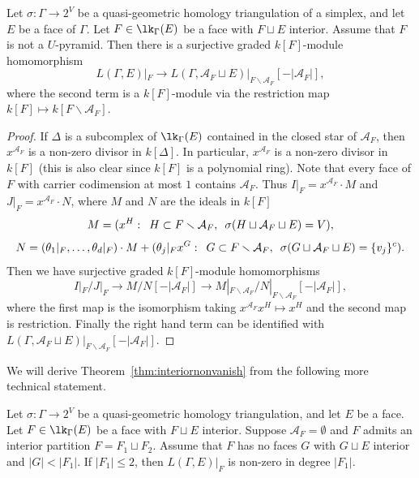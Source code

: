 \begin{lemma}\label{lem:restriction}
Let $\sigma\colon \Gamma \to 2^V$ be a quasi-geometric homology triangulation of a simplex, and let $E$ be a face of $\Gamma$. Let $F \in \lk_{\Gamma}(E)$ be a face with $F \sqcup E$ interior. Assume that $F$ is not a $U$-pyramid. 
Then there is a surjective graded $k[F]$-module homomorphism
$$L(\Gamma, E)|_{F} \to L(\Gamma, \mathcal{A}_F \sqcup E)|_{F \smallsetminus \mathcal{A}_F}[-\vert \mathcal{A}_F \vert],$$
where the second term is a $k[F]$-module via the restriction map  $k[F] \mapsto k[F \smallsetminus \mathcal{A}_F]$.
\end{lemma}



\begin{proof}
If $\Delta$ is a subcomplex of $\lk_{\Gamma}(E)$ contained in the closed star of $\mathcal{A}_F$, then $x^{\mathcal{A}_F}$ is a non-zero divisor in $k[\Delta]$. In particular, $x^{\mathcal{A}_F}$ is a non-zero divisor in $k[F]$ (this is also clear since $k[F]$ is a polynomial ring). Note that every face of $F$ with carrier codimension at most $1$ contains $\mathcal{A}_F$. Thus $I|_F = x^{\mathcal{A}_F} \cdot M$ and $J|_F = x^{\mathcal{A}_F} \cdot N$, where 
$M$ and $N$ are the ideals in $k[F]$ 
\[
M = (x^H: \enskip H \subset F \smallsetminus \mathcal{A}_F, \enskip \sigma(H \sqcup \mathcal{A}_F \sqcup E) = V),
\]
\[
N = (\theta_1|_F,\ldots,\theta_{d}|_F) \cdot M + (\theta_{j}|_{F} x^G: \enskip G \subset F \smallsetminus \mathcal{A}_F, \enskip \sigma(G \sqcup \mathcal{A}_F \sqcup E) = \{v_j\}^c).
\]
Then we have surjective graded $k[F]$-module homomorphisms
\[
I|_F/J|_F \rightarrow M /N [-|\mathcal{A}_F|] \rightarrow  M|_{F \smallsetminus \mathcal{A}_F}/N|_{F \smallsetminus \mathcal{A}_F}[-|\mathcal{A}_F|], 
\]
where the first map is the isomorphism taking $x^{\mathcal{A}_F} x^H \mapsto x^H$ and the second map is restriction. Finally the right hand term can be identified with $L(\Gamma, \mathcal{A}_F \sqcup E)|_{F \smallsetminus \mathcal{A}_F}[-\vert \mathcal{A}_F \vert]$.
\end{proof}

We will derive Theorem~\ref{thm:interiornonvanish} from  the following more technical statement.

\begin{theorem}\label{thm:localizedcase}
Let $\sigma\colon \Gamma \to 2^V$ be a quasi-geometric homology triangulation, and let $E$ be a face. Let $F \in \lk_{\Gamma}(E)$ be a face with $F \sqcup E$ interior. Suppose $\mathcal{A}_F = \emptyset$ and $F$ admits an interior partition $F = F_1 \sqcup F_2$. Assume that $F$ has no faces $G$ with $G \sqcup E$ interior and $ \vert G \vert < \vert F_1 \vert$. If $\vert F_1 \vert \le 2$, then $L(\Gamma, E)|_{F}$ is non-zero in degree $\vert F_1 \vert$. 
\end{theorem}

